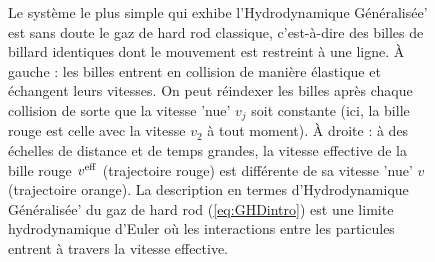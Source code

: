 \begin{figure}[ht]
    \centering
    \caption{Le système le plus simple qui exhibe l'Hydrodynamique Généralisée' est sans doute le gaz de hard rod classique, c'est-à-dire des billes de billard identiques dont le mouvement est restreint à une ligne. À gauche : les billes entrent en collision de manière élastique et échangent leurs vitesses. On peut réindexer les billes après chaque collision de sorte que la vitesse 'nue' \(v_j\) soit constante (ici, la bille rouge est celle avec la vitesse \(v_2\) à tout moment). À droite : à des échelles de distance et de temps grandes, la vitesse effective de la bille rouge \(v^{\rm eff}\) (trajectoire rouge) est différente de sa vitesse 'nue' \(v\) (trajectoire orange). La description en termes d'Hydrodynamique Généralisée' du gaz de hard rod (\ref{eq:GHDintro}) est une limite hydrodynamique d'Euler où les interactions entre les particules entrent à travers la vitesse effective.}
    \label{fig:hardrod}
\end{figure}

